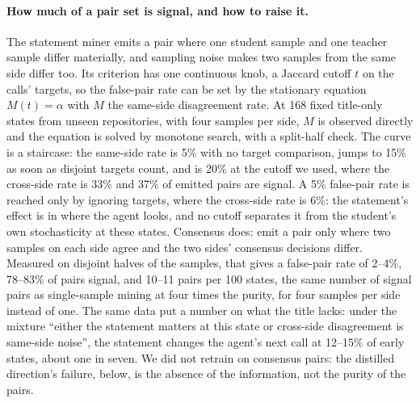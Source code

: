 \documentclass[11pt]{article}
\begin{document}
\paragraph{How much of a pair set is signal, and how to raise it.} The statement miner emits a pair where one student sample and one teacher sample differ materially, and sampling noise makes two samples from the same side differ too. Its criterion has one continuous knob, a Jaccard cutoff $t$ on the calls' targets, so the false-pair rate can be set by the stationary equation $M(t) = \alpha$ with $M$ the same-side disagreement rate. At 168 fixed title-only states from unseen repositories, with four samples per side, $M$ is observed directly and the equation is solved by monotone search, with a split-half check. The curve is a staircase: the same-side rate is 5\% with no target comparison, jumps to 15\% as soon as disjoint targets count, and is 20\% at the cutoff we used, where the cross-side rate is 33\% and 37\% of emitted pairs are signal. A 5\% false-pair rate is reached only by ignoring targets, where the cross-side rate is 6\%: the statement's effect is in where the agent looks, and no cutoff separates it from the student's own stochasticity at these states. Consensus does: emit a pair only where two samples on each side agree and the two sides' consensus decisions differ. Measured on disjoint halves of the samples, that gives a false-pair rate of 2--4\%, 78--83\% of pairs signal, and 10--11 pairs per 100 states, the same number of signal pairs as single-sample mining at four times the purity, for four samples per side instead of one. The same data put a number on what the title lacks: under the mixture ``either the statement matters at this state or cross-side disagreement is same-side noise'', the statement changes the agent's next call at 12--15\% of early states, about one in seven. We did not retrain on consensus pairs: the distilled direction's failure, below, is the absence of the information, not the purity of the pairs.
\end{document}
